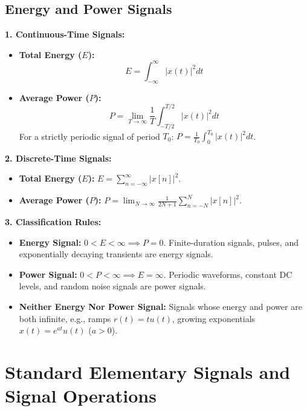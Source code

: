 \documentclass[12pt,a4paper]{article}
\begin{document}
\subsection{Energy and Power Signals}
\begin{tcolorbox}[defbox, title={\textbf{Energy and Power Signal Definitions and Criteria}}]
\textbf{1. Continuous-Time Signals:}
\begin{itemize}[leftmargin=*, itemsep=3pt]
  \item \textbf{Total Energy ($E$):}
  \begin{equation}
    E = \int_{-\infty}^{\infty} |x(t)|^2 dt
  \end{equation}
  \item \textbf{Average Power ($P$):}
  \begin{equation}
    P = \lim_{T \to \infty} \frac{1}{T} \int_{-T/2}^{T/2} |x(t)|^2 dt
  \end{equation}
  For a strictly periodic signal of period $T_0$: $P = \frac{1}{T_0} \int_{0}^{T_0} |x(t)|^2 dt$.
\end{itemize}

\textbf{2. Discrete-Time Signals:}
\begin{itemize}[leftmargin=*, itemsep=3pt]
  \item \textbf{Total Energy ($E$):} $E = \sum_{n=-\infty}^{\infty} |x[n]|^2$.
  \item \textbf{Average Power ($P$):} $P = \lim_{N \to \infty} \frac{1}{2N+1} \sum_{n=-N}^{N} |x[n]|^2$.
\end{itemize}

\textbf{3. Classification Rules:}
\begin{itemize}[leftmargin=*, itemsep=3pt]
  \item \textbf{Energy Signal:} $0 < E < \infty \implies P = 0$. Finite-duration signals, pulses, and exponentially decaying transients are energy signals.
  \item \textbf{Power Signal:} $0 < P < \infty \implies E = \infty$. Periodic waveforms, constant DC levels, and random noise signals are power signals.
  \item \textbf{Neither Energy Nor Power Signal:} Signals whose energy and power are both infinite, e.g., ramps $r(t) = t u(t)$, growing exponentials $x(t) = e^{at} u(t)$ ($a > 0$).
\end{itemize}
\end{tcolorbox}

\section{Standard Elementary Signals and Signal Operations}
\end{document}
